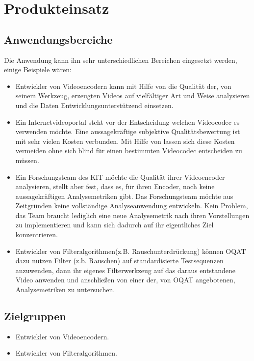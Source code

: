 \chapter{Produkteinsatz}
\section{Anwendungsbereiche}
Die Anwendung kann ihn sehr unterschiedlichen Bereichen eingesetzt werden, einige Beispiele wären:
\begin{itemize}
\item Entwickler von Videoencodern kann mit Hilfe von \projektTitel die Qualität der, von seinem
		Werkzeug, erzeugten Videos auf vielfältiger Art und Weise analysieren und die Daten
		Entwicklungsunterstützend einsetzen.
\item Ein Internetvideoportal steht vor der Entscheidung welchen Videocodec es verwenden möchte.
		Eine aussagekräftige subjektive Qualitätsbewertung ist mit sehr vielen Kosten verbunden.
		Mit Hilfe von \projektTitel lassen sich diese Kosten vermeiden ohne sich blind für
		einen bestimmten Videocodec entscheiden zu müssen.
\item Ein Forschungsteam des \gls{KIT} möchte die Qualität ihrer Videoencoder analysieren, stellt
		aber fest, dass es, für ihren Encoder, noch keine aussagekräftigen Analysemetriken gibt.
		Das Forschungsteam möchte aus Zeitgründen keine vollständige Analyseanwendung entwickeln.
		Kein Problem, das Team braucht lediglich \projektTitel eine neue Analysemetrik nach ihren
		Vorstellungen zu implementieren und kann sich dadurch auf ihr eigentliches Ziel konzentrieren. 
\item Entwickler von Filteralgorithmen(z.B. Rauschunterdrückung) können \gls{OQAT} dazu nutzen Filter (z.b. Rauschen) auf standardisierte Testsequenzen anzuwenden, dann ihr eigenes Filterwerkzeug auf das daraus entstandene Video anwenden und anschließen von einer der, von \gls{OQAT} angebotenen, Analysemetriken zu untersuchen.
\end{itemize}
\section{Zielgruppen}
\begin{itemize}
\item Entwickler von Videoencodern.
\item Entwickler von Filteralgorithmen.
\end{itemize}